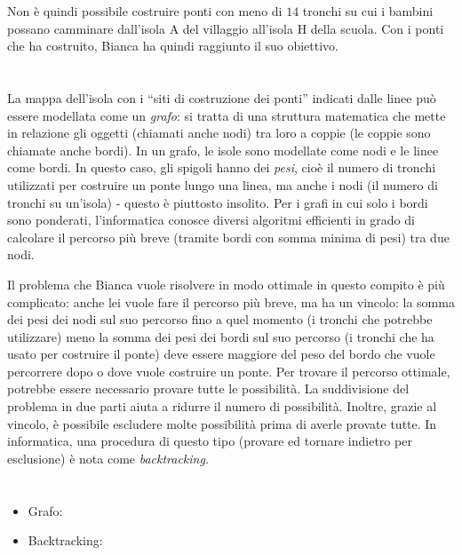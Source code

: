 {{Non è quindi possibile costruire ponti con meno di $14$ tronchi su cui i bambini possano camminare dall’isola A del villaggio all’isola H della scuola.  Con i ponti che ha costruito, Bianca ha quindi raggiunto il suo obiettivo.



\section*{\BrochureItsInformatics}
La mappa dell’isola con i \enquote{siti di costruzione dei ponti} indicati dalle linee può essere modellata come un \emph{grafo}: si tratta di una struttura matematica che mette in relazione gli oggetti (chiamati anche nodi) tra loro a coppie (le coppie sono chiamate anche bordi).  In un grafo, le isole sono modellate come nodi e le linee come bordi. In questo caso, gli spigoli hanno dei \emph{pesi}, cioè il numero di tronchi utilizzati per costruire un ponte lungo una linea, ma anche i nodi (il numero di tronchi su un’isola) - questo è piuttosto insolito. Per i grafi in cui solo i bordi sono ponderati, l’informatica conosce diversi algoritmi efficienti in grado di calcolare il percorso più breve (tramite bordi con somma minima di pesi) tra due nodi.

Il problema che Bianca vuole risolvere in modo ottimale in questo compito è più complicato: anche lei vuole fare il percorso più breve, ma ha un vincolo: la somma dei pesi dei nodi sul suo percorso fino a quel momento (i tronchi che potrebbe utilizzare) meno la somma dei pesi dei bordi sul suo percorso (i tronchi che ha usato per costruire il ponte) deve essere maggiore del peso del bordo che vuole percorrere dopo o dove vuole costruire un ponte. Per trovare il percorso ottimale, potrebbe essere necessario provare tutte le possibilità. La suddivisione del problema in due parti aiuta a ridurre il numero di possibilità. Inoltre, grazie al vincolo, è possibile escludere molte possibilità prima di averle provate tutte. In informatica, una procedura di questo tipo (provare ed tornare indietro per esclusione) è nota come \emph{backtracking}.



\section*{\BrochureWebsitesAndKeywords}
{\raggedright
\begin{itemize}
  \item Grafo: \href{https://it.wikipedia.org/wiki/Grafo}{}
  \item Backtracking: \href{https://it.wikipedia.org/wiki/Backtracking}{}
\end{itemize}


}}}
